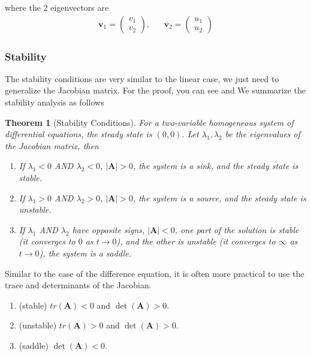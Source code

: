 \documentclass[11pt,a4paper]{book}
\newtheorem{theorem}{Theorem}[section]
\theoremstyle{definition}\newtheorem{definition}{Definition}
\theoremstyle{definition}\newtheorem{fact}{Fact}
\theoremstyle{definition}\newtheorem{remark}{Remark}
\theoremstyle{definition}\newtheorem{ex}{Ex.}
\theoremstyle{definition}\newtheorem{project}{Project}
\theoremstyle{definition}\newtheorem{problem}{Problem}
\theoremstyle{definition}\newtheorem{example}{Example}
\newenvironment{ftheorem}
{\begin{mdframed}\begin{theorem}}
		{\end{theorem}\end{mdframed}}
\numberwithin{theorem}{section}
\numberwithin{corollary}{chapter}
\numberwithin{assumption}{chapter}
\numberwithin{definition}{chapter}
\numberwithin{prop}{chapter}
\numberwithin{notation}{chapter}
\numberwithin{problem}{chapter}
\numberwithin{example}{chapter}
\numberwithin{fact}{chapter}
\numberwithin{ex}{chapter}
\def\A{\mathbf A}
\def\v{\mathbf v}
\begin{document}
	where the 2 eigenvectors are
	\begin{align*}
		\v_1 = \begin{pmatrix}
			v_1 \\ v_2
		\end{pmatrix}, && \v_2 = \begin{pmatrix}
			u_1 \\ u_2
		\end{pmatrix}
	\end{align*}
	
	\subsubsection{Stability}
	The stability conditions are very similar to the linear case, we just need to generalize the Jacobian matrix. For the proof, you can see \citet[Ch 22]{simon1994mathematics} and \citet[Ch 6.8, p.251]{sydsaeter2008further}
	We summarize the stability analysis as follows
	\begin{ftheorem}[Stability Conditions]
		For a two-variable homogeneous system of differential equations, the steady state is $(0,0)$. Let $\lambda_1, \lambda_2$ be the eigenvalues of the Jacobian matrix, then
		\begin{enumerate}
			\item If $\lambda_1 < 0$ AND $\lambda_2 < 0$, $|\A| > 0$, the system is a sink, and the steady state is stable.
			\item If $\lambda_1 > 0$ AND $\lambda_2 > 0$, $|\A| > 0$, the system is a source, and the steady state is unstable.
			\item If $\lambda_1$ AND $\lambda_2$ have opposite signs, $|\A| < 0$, one part of the solution is stable (it converges to $0$ as $t\to 0$), and the other is unstable (it converges to $\infty$ as $t\to 0$), the system is a saddle.
		\end{enumerate}
	\end{ftheorem}
	Similar to the case of the difference equation, it is often more practical to use the trace and determinants of the Jacobian.
	
	\begin{enumerate}
		\item (stable) $tr(\A) < 0$ and $\det(\A) > 0$.
		\item (unstable) $tr(\A) > 0$ and $\det(\A) > 0$.
		\item (saddle) $\det(\A) < 0$.
	\end{enumerate}
	
\end{document}
